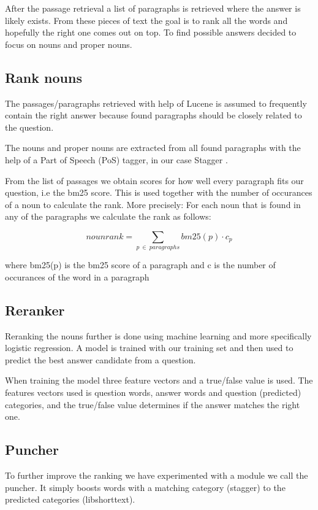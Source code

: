 After the passage retrieval a list of paragraphs is retrieved where the answer is likely exists. 
From these pieces of text the goal is to rank all the words and hopefully the right one comes out on top.
To find possible answers  decided to focus on nouns and proper nouns. 

\subsection{Rank nouns}

The passages/paragraphs retrieved with help of Lucene is assumed to frequently contain the right answer
because found paragraphs should be closely related to the question.

The nouns and proper nouns are extracted from all found paragraphs with the help of a Part of Speech (PoS) 
tagger, in our case Stagger \cite{stagger}.

From the list of passages we obtain scores for how well every paragraph fits our question, i.e the bm25 score. 
This is used together with the number of occurances of a noun to calculate the rank.
More precisely: For each noun that is found in any of the paragraphs we calculate the rank as follows:

\[ nounrank = \sum_{p\:\in\:paragraphs}bm25(p) \cdot c_p \]

where bm25(p) is the bm25 score of a paragraph and c is the number of occurances of the word in a paragraph

\subsection{Reranker}

Reranking the nouns further is done using machine learning and more specifically logistic regression.
A model is trained with our training set and then used to predict the best answer candidate from a question.

When training the model three feature vectors and a true/false value is used. 
The features vectors used is question words, answer words and question (predicted) categories, and the true/false
value determines if the answer matches the right one.


\subsection{Puncher}

To further improve the ranking we have experimented with a module we call the puncher. It simply boosts 
words with a matching category (stagger) to the predicted categories (libshorttext). 